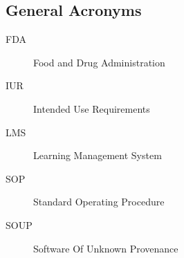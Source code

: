 \subsection{General Acronyms}
\begin{description}
\item[FDA] \quad Food and Drug Administration
\item[IUR] \quad Intended Use Requirements
\item[LMS] \quad Learning Management System
\item[SOP] \quad Standard Operating Procedure
\item[SOUP] \quad Software Of Unknown Provenance
\end{description}
